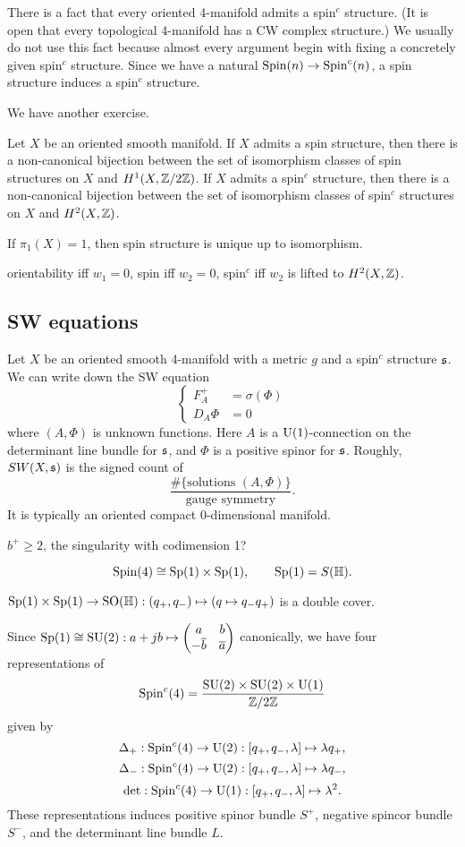 \documentclass{../../../small}
\begin{document}
There is a fact that every oriented 4-manifold admits a spin$^c$ structure.
(It is open that every topological 4-manifold has a CW complex structure.)
We usually do not use this fact because almost every argument begin with fixing a concretely given spin$^c$ structure.
Since we have a natural $\mathrm{Spin}(n)\to\mathrm{Spin}^c(n)$, a spin structure induces a spin$^c$ structure.


We have another exercise.
\begin{lem}
Let $X$ be an oriented smooth manifold.
If $X$ admits a spin structure, then there is a non-canonical bijection between the set of isomorphism classes of spin structures on $X$ and $H^1(X,\mathbb{Z}/2\mathbb{Z})$.
If $X$ admits a spin$^c$ structure, then there is a non-canonical bijection between the set of isomorphism classes of spin$^c$ structures on $X$ and $H^2(X,\mathbb{Z})$.
\end{lem}

If $\pi_1(X)=1$, then spin structure is unique up to isomorphism.

orientability iff $w_1=0$, spin iff $w_2=0$, spin$^c$ iff $w_2$ is lifted to $H^2(X,\mathbb{Z})$.

\subsection{SW equations}
Let $X$ be an oriented smooth 4-manifold with a metric $g$ and a spin$^c$ structure $\mathfrak{s}$.
We can write down the SW equation
\[\left\{\begin{alignedat}{1}
F_A^+&=\sigma(\Phi)\\
D_A\Phi&=0
\end{alignedat}\right.\]
where $(A,\Phi)$ is unknown functions.
Here $A$ is a $\mathrm{U}(1)$-connection on the determinant line bundle for $\mathfrak{s}$, and $\Phi$ is a positive spinor for $\mathfrak{s}$.
Roughly, $SW(X,\mathfrak{s})$ is the signed count of
\[\frac{\#\{\text{solutions $(A,\Phi)$}\}}{\text{gauge symmetry}}.\]
It is typically an oriented compact 0-dimensional manifold.

$b^+\ge2$, the singularity with codimension 1?


\begin{lem}
\[\mathrm{Spin}(4)\cong\mathrm{Sp}(1)\times\mathrm{Sp}(1),\qquad\mathrm{Sp}(1)=S(\mathbb{H}).\]
\end{lem}
\begin{pf}
$\mathrm{Sp}(1)\times\mathrm{Sp}(1)\to\mathrm{SO}(\mathbb{H}):(q_+,q_-)\mapsto(q\mapsto q_-q_+)$ is a double cover.
\end{pf}

Since $\mathrm{Sp}(1)\cong\mathrm{SU}(2):a+jb\mapsto\begin{pmatrix}a&b\\-\overline b&\overline a\end{pmatrix}$ canonically, we have four representations of
\[\mathrm{Spin}^c(4)=\frac{\mathrm{SU}(2)\times\mathrm{SU}(2)\times\mathrm{U}(1)}{\mathbb{Z}/2\mathbb{Z}}\]
given by
\[\Delta_+:\mathrm{Spin}^c(4)\to\mathrm{U}(2):[q_+,q_-,\lambda]\mapsto\lambda q_+,\]
\[\Delta_-:\mathrm{Spin}^c(4)\to\mathrm{U}(2):[q_+,q_-,\lambda]\mapsto\lambda q_-,\]
\[\det:\mathrm{Spin}^c(4)\to\mathrm{U}(1):[q_+,q_-,\lambda]\mapsto\lambda^2.\]
These representations induces positive spinor bundle $S^+$, negative spincor bundle $S^-$, and the determinant line bundle $L$.
\end{document}
